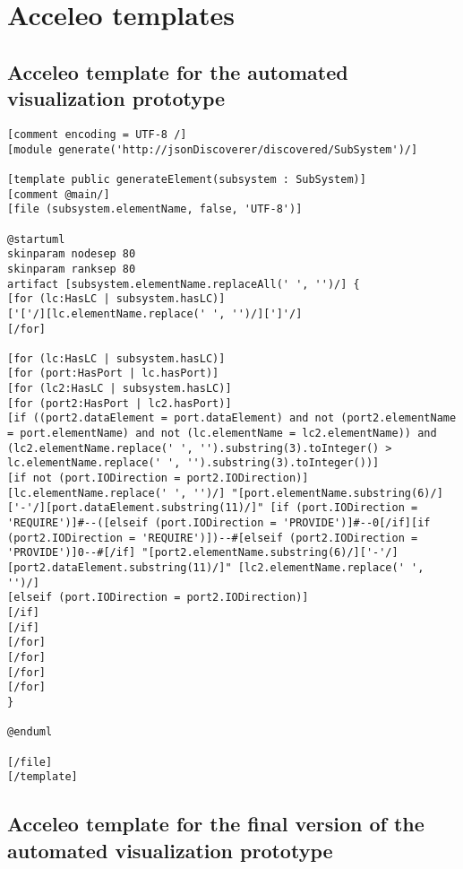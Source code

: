 \chapter{Acceleo templates}
\label{app1}

\section{Acceleo template for the automated visualization prototype}
\label{app1:prototype}
\begin{lstlisting}[caption=Acceleo template for generated textual description in PlantUML lanauge,label=code:acceleo_template]
[comment encoding = UTF-8 /]
[module generate('http://jsonDiscoverer/discovered/SubSystem')/]

[template public generateElement(subsystem : SubSystem)]
[comment @main/]
[file (subsystem.elementName, false, 'UTF-8')]

@startuml
skinparam nodesep 80
skinparam ranksep 80
artifact [subsystem.elementName.replaceAll(' ', '')/] {
[for (lc:HasLC | subsystem.hasLC)]
['['/][lc.elementName.replace(' ', '')/][']'/]
[/for]

[for (lc:HasLC | subsystem.hasLC)]
[for (port:HasPort | lc.hasPort)]
[for (lc2:HasLC | subsystem.hasLC)]
[for (port2:HasPort | lc2.hasPort)]
[if ((port2.dataElement = port.dataElement) and not (port2.elementName = port.elementName) and not (lc.elementName = lc2.elementName)) and (lc2.elementName.replace(' ', '').substring(3).toInteger() > lc.elementName.replace(' ', '').substring(3).toInteger())]
[if not (port.IODirection = port2.IODirection)]
[lc.elementName.replace(' ', '')/] "[port.elementName.substring(6)/]['-'/][port.dataElement.substring(11)/]" [if (port.IODirection = 'REQUIRE')]#--([elseif (port.IODirection = 'PROVIDE')]#--0[/if][if (port2.IODirection = 'REQUIRE')])--#[elseif (port2.IODirection = 'PROVIDE')]0--#[/if] "[port2.elementName.substring(6)/]['-'/][port2.dataElement.substring(11)/]" [lc2.elementName.replace(' ', '')/]
[elseif (port.IODirection = port2.IODirection)]
[/if]
[/if]
[/for]
[/for]
[/for]
[/for]
}

@enduml

[/file]
[/template]
\end{lstlisting}


\section{Acceleo template for the final version of the automated visualization prototype}
\label{app1:final}

